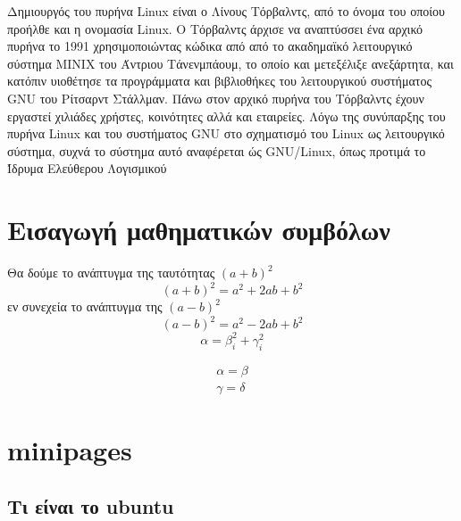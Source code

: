 \documentclass[a4paper,titlepage,oneside,12pt]{article}
\begin{document}
Δημιουργός του πυρήνα Linux είναι ο Λίνους Τόρβαλντς, από το όνομα του οποίου
προήλθε και η ονομασία Linux. O Τόρβαλντς άρχισε να αναπτύσσει ένα αρχικό πυρήνα το 1991
χρησιμοποιώντας κώδικα από από το ακαδημαϊκό λειτουργικό σύστημα MINIX του Άντριου 
Τάνενμπάουμ, το οποίο και μετεξέλιξε ανεξάρτητα, και κατόπιν υιοθέτησε τα προγράμματα και βιβλιοθήκες
του λειτουργικού συστήματος GNU του Ρίτσαρντ Στάλλμαν. Πάνω στον αρχικό πυρήνα του
Τόρβαλντς έχουν εργαστεί χιλιάδες χρήστες, κοινότητες αλλά και εταιρείες. Λόγω της
συνύπαρξης του πυρήνα Linux και του συστήματος GNU στο σχηματισμό του Linux ως 
λειτουργικό σύστημα, συχνά το σύστημα αυτό αναφέρεται ώς GNU/Linux, 
όπως προτιμά το Ίδρυμα Ελεύθερου 
Λογισμικού
 
\pagebreak
\section{Εισαγωγή μαθηματικών συμβόλων}
\parindent=0in
Θα δούμε το ανάπτυγμα της ταυτότητας $(a+b)^2$
\begin{equation}
(a+b)^2=a^2+2ab+b^2
\end{equation}
εν συνεχεία το ανάπτυγμα της $(a-b)^2$
\begin{equation}
(a-b)^2=a^2-2ab+b^2
\end{equation}
\begin{equation} 
    \alpha = \beta^2_i + \gamma^2_i 
\end{equation}
 
\begin{align} 
    \alpha = \beta\\
    \gamma = \delta
\end{align}
\pagebreak
\section{minipages}

\subsection{Τι είναι το ubuntu}
\end{document}
